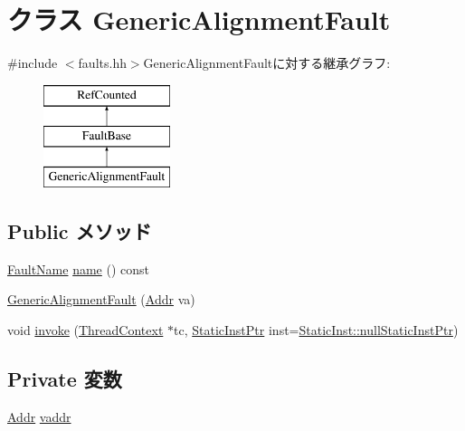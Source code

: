 \hypertarget{classGenericAlignmentFault}{
\section{クラス GenericAlignmentFault}
\label{classGenericAlignmentFault}
}


{\ttfamily \#include $<$faults.hh$>$}GenericAlignmentFaultに対する継承グラフ:\begin{figure}[H]
\begin{center}
\leavevmode
\includegraphics[height=3cm]{classGenericAlignmentFault}
\end{center}
\end{figure}
\subsection*{Public メソッド}
\begin{DoxyCompactItemize}
\item 
\hyperlink{sim_2faults_8hh_abb196df64725e5c2568c900cf130d8d7}{FaultName} \hyperlink{classGenericAlignmentFault_a73adb23259baf912a81683a9790a303f}{name} () const 
\item 
\hyperlink{classGenericAlignmentFault_ae92105b81024d8f266cfb1b08fbbe35f}{GenericAlignmentFault} (\hyperlink{base_2types_8hh_af1bb03d6a4ee096394a6749f0a169232}{Addr} va)
\item 
void \hyperlink{classGenericAlignmentFault_a2bd783b42262278d41157d428e1f8d6f}{invoke} (\hyperlink{classThreadContext}{ThreadContext} $\ast$tc, \hyperlink{classRefCountingPtr}{StaticInstPtr} inst=\hyperlink{classStaticInst_aa793d9793af735f09096369fb17567b6}{StaticInst::nullStaticInstPtr})
\end{DoxyCompactItemize}
\subsection*{Private 変数}
\begin{DoxyCompactItemize}
\item 
\hyperlink{base_2types_8hh_af1bb03d6a4ee096394a6749f0a169232}{Addr} \hyperlink{classGenericAlignmentFault_a9f933b300ef63eea367ca82f8da31025}{vaddr}
\end{DoxyCompactItemize}


